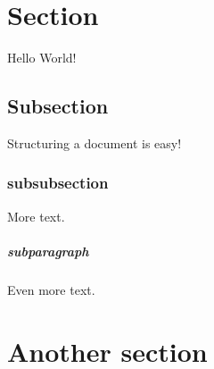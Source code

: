 \documentclass{article}
\begin{document}
	\section{Section}
	Hello World!
	\subsection{Subsection}
	Structuring a document is easy!
	\subsubsection{subsubsection}
	More text.
	\subparagraph{subparagraph}
	Even more text.
	\section{Another section}
\end{document}

